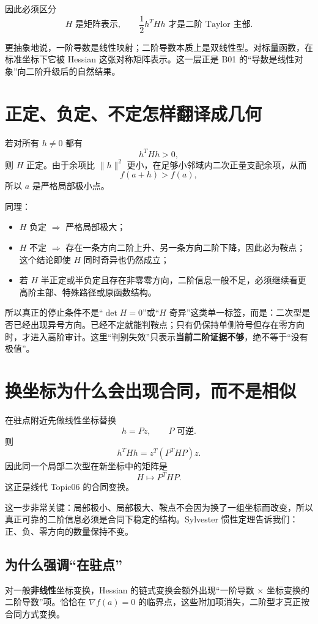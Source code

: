\documentclass[profile=standard]{ipara-handbook}
\begin{document}
因此必须区分
\[
\boxed{H\text{ 是矩阵表示},\qquad \frac12 h^THh\text{ 才是二阶 Taylor 主部}.}
\]

更抽象地说，一阶导数是线性映射；二阶导数本质上是双线性型。对标量函数，在标准坐标下它被 Hessian 这张对称矩阵表示。这一层正是 B01 的“导数是线性对象”向二阶升级后的自然结果。

\section{正定、负定、不定怎样翻译成几何}
若对所有 $h\neq0$ 都有
\[
h^THh>0,
\]
则 $H$ 正定。由于余项比 $\lVert h\rVert^2$ 更小，在足够小邻域内二次正量支配余项，从而
\[
f(a+h)>f(a),
\]
所以 $a$ 是严格局部极小点。

同理：
\begin{itemize}
\item $H$ 负定 $\Rightarrow$ 严格局部极大；
\item $H$ 不定 $\Rightarrow$ 存在一条方向二阶上升、另一条方向二阶下降，因此必为鞍点；这个结论即使 $H$ 同时奇异也仍然成立；
\item 若 $H$ 半正定或半负定且存在非零零方向，二阶信息一般不足，必须继续看更高阶主部、特殊路径或原函数结构。
\end{itemize}

所以真正的停止条件不是“$\det H=0$”或“$H$ 奇异”这类单一标签，而是：二次型是否已经出现异号方向。已经不定就能判鞍点；只有仍保持单侧符号但存在零方向时，才进入高阶审计。这里“判别失效”只表示\textbf{当前二阶证据不够}，绝不等于“没有极值”。

\section{换坐标为什么会出现合同，而不是相似}
在驻点附近先做线性坐标替换
\[
h=Pz,
\qquad P\text{ 可逆}.
\]
则
\[
h^THh=z^T(P^THP)z.
\]
因此同一个局部二次型在新坐标中的矩阵是
\[
\boxed{H\mapsto P^THP.}
\]
这正是线代 Topic06 的合同变换。

这一步非常关键：局部极小、局部极大、鞍点不会因为换了一组坐标而改变，所以真正可靠的二阶信息必须是合同下稳定的结构。Sylvester 惯性定理告诉我们：正、负、零方向的数量保持不变。

\subsection{为什么强调“在驻点”}
对一般\textbf{非线性}坐标变换，Hessian 的链式变换会额外出现“一阶导数 × 坐标变换的二阶导数”项。恰恰在 $\nabla f(a)=0$ 的临界点，这些附加项消失，二阶型才真正按合同方式变换。
\end{document}
